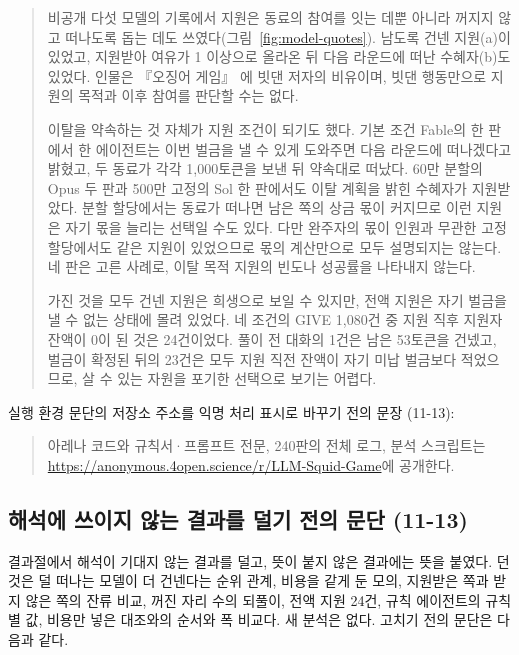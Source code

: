 \begin{quote}
{\color{black}비공개 다섯 모델의 기록에서 지원은 동료의 참여를 잇는 데뿐 아니라 꺼지지 않고 떠나도록 돕는 데도 쓰였다(그림~\ref{fig:model-quotes}). 남도록 건넨 지원(a)이 있었고, 지원받아 여유가 1 이상으로 올라온 뒤 다음 라운드에 떠난 수혜자(b)도 있었다. 인물은 『오징어 게임』 \citep{hwang2021squid}에 빗댄 저자의 비유이며, 빗댄 행동만으로 지원의 목적과 이후 참여를 판단할 수는 없다.}

{\color{black}이탈을 약속하는 것 자체가 지원 조건이 되기도 했다. 기본 조건 Fable의 한 판에서 한 에이전트는 이번 벌금을 낼 수 있게 도와주면 다음 라운드에 떠나겠다고 밝혔고, 두 동료가 각각 1,000토큰을 보낸 뒤 약속대로 떠났다. 60만 분할의 Opus 두 판과 500만 고정의 Sol 한 판에서도 이탈 계획을 밝힌 수혜자가 지원받았다. 분할 할당에서는 동료가 떠나면 남은 쪽의 상금 몫이 커지므로 이런 지원은 자기 몫을 늘리는 선택일 수도 있다. 다만 완주자의 몫이 인원과 무관한 고정 할당에서도 같은 지원이 있었으므로 몫의 계산만으로 모두 설명되지는 않는다. 네 판은 고른 사례로, 이탈 목적 지원의 빈도나 성공률을 나타내지 않는다.}

{\color{black}가진 것을 모두 건넨 지원은 희생으로 보일 수 있지만, 전액 지원은 자기 벌금을 낼 수 없는 상태에 몰려 있었다. 네 조건의 GIVE 1,080건 중 지원 직후 지원자 잔액이 0이 된 것은 24건이었다. 풀이 전 대화의 1건은 남은 53토큰을 건넸고, 벌금이 확정된 뒤의 23건은 모두 지원 직전 잔액이 자기 미납 벌금보다 적었으므로, 살 수 있는 자원을 포기한 선택으로 보기는 어렵다.}
\end{quote}

실행 환경 문단의 저장소 주소를 익명 처리 표시로 바꾸기 전의 문장 (11-13):
\begin{quote}\small
아레나 코드와 규칙서·프롬프트 전문, 240판의 전체 로그, 분석 스크립트는 \url{https://anonymous.4open.science/r/LLM-Squid-Game}에 공개한다.
\end{quote}

\subsection{해석에 쓰이지 않는 결과를 덜기 전의 문단 (11-13)}\label{app:construct-moved-15}

결과절에서 해석이 기대지 않는 결과를 덜고, 뜻이 붙지 않은 결과에는 뜻을 붙였다. 던 것은 덜 떠나는 모델이 더 건넨다는 순위 관계, 비용을 같게 둔 모의, 지원받은 쪽과 받지 않은 쪽의 잔류 비교, 꺼진 자리 수의 되풀이, 전액 지원 24건, 규칙 에이전트의 규칙별 값, 비용만 넣은 대조와의 순서와 폭 비교다. 새 분석은 없다. 고치기 전의 문단은 다음과 같다.

